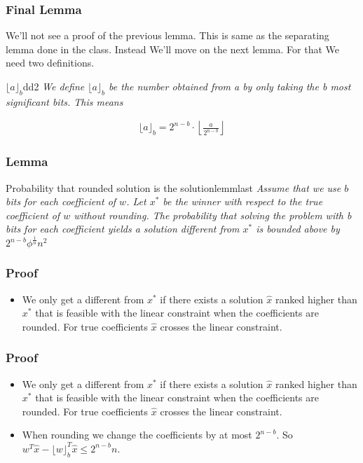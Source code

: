 \begin{frame}
    \frametitle{Final Lemma}

    We'll not see a proof of the previous lemma. This is same as the separating
    lemma done in the class. Instead We'll move on the next lemma. For that We need
    two definitions.

    \begin{define}{$\lfloor a \rfloor _{b}$}{dd2}
        \textit{We define $\lfloor a \rfloor _{b}$ be the number obtained from a by only taking the b most significant bits. This means}

        \begin{align*}
            \lfloor a \rfloor _{b} = 2^{n - b} \cdot \left\lfloor \frac{a}{2^{n - b}} \right\rfloor
        \end{align*}
    \end{define}

\end{frame}

\begin{frame}
    \frametitle{Lemma}

    \begin{lemm}{Probability that rounded solution is the solution}{lemmlast}
        \textit{Assume that we use $b$ bits for each coefficient of $w$. Let $x^{*}$
            be the winner with respect to the true coefficient of $w$ without rounding. 
            The probability that solving the problem with b bits for each coefficient yields a 
            solution different from $x^{*}$ is bounded above by $2^{n - b} \phi^{\frac{1}{n}} n^2$} 
    \end{lemm}

\end{frame}

\begin{frame}
    \frametitle{Proof}

    
    \begin{itemize}
        \item We only get a different from $x^{*}$ if there exists a solution $\hat{x}$ ranked higher than
        $x^{*}$ that is feasible with the linear constraint when the coefficients are rounded. For true coefficients
        $\hat{x}$ crosses the linear constraint.
    \end{itemize}

\end{frame}


\begin{frame}
    \frametitle{Proof}

    
    \begin{itemize}
        \item We only get a different from $x^{*}$ if there exists a solution $\hat{x}$ ranked higher than
        $x^{*}$ that is feasible with the linear constraint when the coefficients are rounded. For true coefficients
        $\hat{x}$ crosses the linear constraint.
        \item When rounding we change the coefficients by at most $2^{n - b}$. So $w^T \hat{x} - \lfloor w \rfloor _{b} ^T \hat{x} \leq 2^{n - b} n$.
    \end{itemize}

\end{frame}

